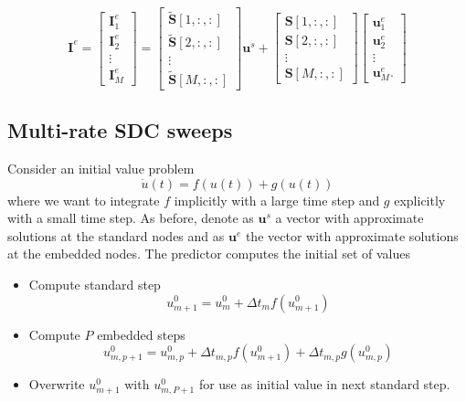 \documentclass{article}
\newcommand{\ve}[1]{\mathbf{#1}}
\begin{document}
\begin{equation}
	\ve{I}^e = 
	\begin{bmatrix}
		\ve{I}^e_1 \\ \ve{I}^e_2 \\ \vdots \\ \ve{I}^e_M
	\end{bmatrix} = 
	\begin{bmatrix}
		\tilde{\ve{S}}[1,:,:] \\ \tilde{\ve{S}}[2,:,:]  \\ \vdots \\ \tilde{\ve{S}}[M,:,:] 
	\end{bmatrix}
	\ve{u}^s
	+
	\begin{bmatrix}
		\ve{S}[1,:,:] \\ \ve{S}[2,:,:] \\ \vdots \\ \ve{S}[M,:,:] 
	\end{bmatrix}
	\begin{bmatrix}
		\ve{u}^e_1 \\ \ve{u}^e_2 \\ \vdots \\ \ve{u}^e_M.
	\end{bmatrix}
\end{equation}
%
%
%
\subsection*{Multi-rate SDC sweeps}
Consider an initial value problem
\begin{equation}
	\dot{u}(t) = f(u(t)) + g(u(t))
\end{equation}
where we want to integrate $f$ implicitly with a large time step and $g$ explicitly with a small time step.
As before, denote as $\ve{u}^s$ a vector with approximate solutions at the standard nodes and as $\ve{u}^{e}$ the vector with approximate solutions at the embedded nodes.
The predictor computes the initial set of values
\begin{itemize}
	\item Compute standard step
	\begin{equation*}
		u^0_{m+1} = u^0_m + \Delta t_m f(u^0_{m+1})
	\end{equation*}
	\item Compute $P$ embedded steps
	\begin{equation*}
		u^0_{m,p+1} = u^0_{m,p} + \Delta t_{m,p} f(u^0_{m+1}) + \Delta t_{m,p} g(u^0_{m,p})
	\end{equation*}
	\item Overwrite $u^0_{m+1}$ with $u^0_{m,P+1}$ for use as initial value in next standard step.
\end{itemize}
\end{document}
